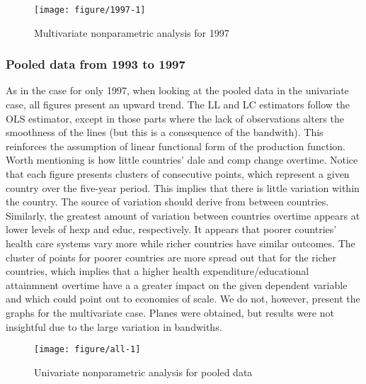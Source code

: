\documentclass[12pt,a4paper]{article}\usepackage[]{graphicx}\usepackage[]{color}
\newenvironment{knitrout}{}{} %
\begin{document}
\begin{knitrout}
\color{fgcolor}\begin{figure}[htbp]

{\centering \texttt{[image: figure/1997-1]} 

}

\caption[Multivariate nonparametric analysis for 1997]{Multivariate nonparametric analysis for 1997}\label{fig:1997}
\end{figure}


\end{knitrout}

\subsubsection{Pooled data from 1993 to 1997}

As in the case for only 1997, when looking at the pooled data in the univariate case, all figures present an upward trend. The LL and LC estimators follow the OLS estimator, except in those parts where the lack of observations alters the smoothness of the lines (but this is a consequence of the bandwith). This reinforces the assumption of linear functional form of the production function. Worth mentioning is how little countries' dale and comp change overtime. Notice that each figure presents clusters of consecutive points, which represent a given country over the five-year period. This implies that there is little variation within the country. The source of variation should derive from between countries. Similarly, the greatest amount of variation between countries overtime appears at lower levels of hexp and educ, respectively. It appears that poorer countries' health care systems vary more while richer countries have similar outcomes. The cluster of points for poorer countries are more spread out that for the richer countries, which implies that a higher health expenditure/educational attainmnent overtime have a a greater impact on the given dependent variable and which could point out to economies of scale. We do not, however, present the graphs for the multivariate case. Planes were obtained, but results were not insightful due to the large variation in bandwiths.

\begin{knitrout}
\color{fgcolor}\begin{figure}[htbp]

{\centering \texttt{[image: figure/all-1]} 

}

\caption[Univariate nonparametric analysis for pooled data]{Univariate nonparametric analysis for pooled data}\label{fig:all}
\end{figure}


\end{knitrout}
\end{document}
